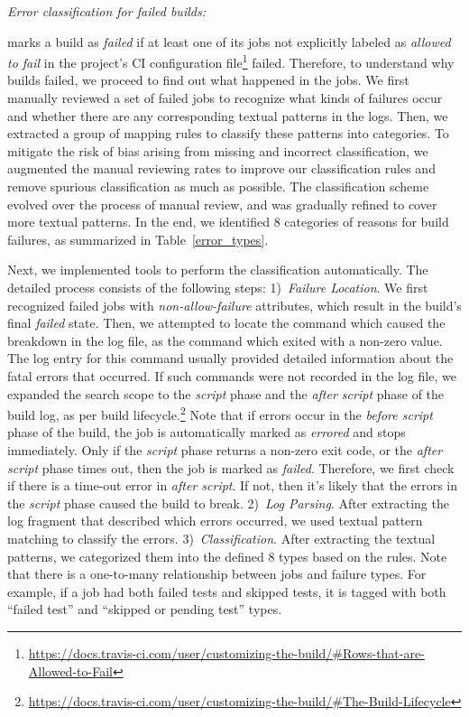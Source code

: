 

\smallskip\noindent\emph{Error classification for failed builds:}

\Tvis marks a build as \textit{failed} if at least one of its jobs not explicitly 
labeled as \emph{allowed to fail} in the project's CI configuration 
file\footnote{\url{https://docs.travis-ci.com/user/customizing-the-build/#Rows-that-are-Allowed-to-Fail}} failed.
Therefore, to understand why \Tvis builds failed, we proceed to find out 
what happened in the jobs. 
We first manually reviewed a set of failed jobs to recognize what kinds of 
failures occur and whether there are any corresponding textual patterns in 
the logs. 
Then, we extracted a group of mapping rules to classify these patterns into 
categories. 
To mitigate the risk of bias arising from missing and incorrect classification, 
we augmented the manual reviewing rates to improve our classification 
rules and remove spurious classification as much as possible. 
The classification scheme evolved over the process of manual review, and 
was gradually refined to cover more textual patterns. 
In the end, we identified 8 categories of reasons for build failures, 
as summarized in Table~\ref{error_types}. 

Next, we implemented tools to perform the classification automatically. 
The detailed process consists of the following steps: 1)~\emph{Failure Location}. 
We first recognized failed jobs with \textit{non-allow-failure} attributes, which 
result in the build's final \textit{failed} state. 
Then, we attempted to locate the command which caused the breakdown 
in the log file, as the command which exited with a non-zero value.
The log entry for this command usually provided detailed information about 
the fatal errors that occurred. 
If such commands were not recorded in the log file, we expanded the search 
scope to the \textit{script} phase and the \textit{after script} phase of the 
build log, as per \Tvis build lifecycle.\footnote{\url{https://docs.travis-ci.com/user/customizing-the-build/#The-Build-Lifecycle}}
Note that if errors occur in the \emph{before script} phase of the build, the 
job is automatically marked as \textit{errored} and stops immediately. 
Only if the \textit{script} phase returns a non-zero exit code, or the \textit{after 
script} phase times out, then the job is marked as \textit{failed}. 
Therefore, we first check if there is a time-out error in \textit{after script}. 
If not, then it's likely that the errors in the \textit{script} phase caused the 
build to break. 
2)~\emph{Log Parsing}. 
After extracting the log fragment that described which errors occurred, we 
used textual pattern matching to classify the errors. 
3)~\emph{Classification}. 
After extracting the textual patterns, we categorized them into the defined 
8 types based on the rules. 
Note that there is a one-to-many relationship between jobs and failure types. 
For example, if a job had both failed tests and skipped tests, it is tagged 
with both ``failed test'' and ``skipped or pending test'' types.


